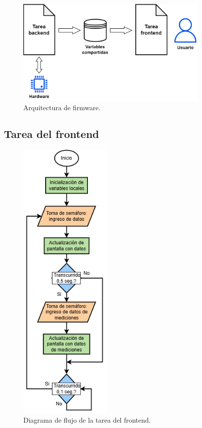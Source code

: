 \begin{figure}[H]
\centering
\includegraphics[width=0.85\textwidth]{./Figures/arqFW.png}
\caption{Arquitectura de firmware.}
\label{fig:arqFW}
\end{figure}

\subsection{Tarea del frontend}



\begin{figure}[H]
\centering
\includegraphics[width=0.4\textwidth]{./Figures/flowTaskDisp.png}
\caption{Diagrama de flujo de la tarea del frontend.}
\label{fig:taskDisp}
\end{figure}

